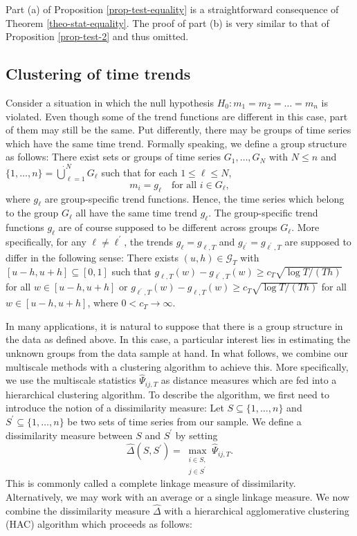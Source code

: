 Part (a) of Proposition \ref{prop-test-equality} is a straightforward consequence of Theorem \ref{theo-stat-equality}. The proof of part (b) is very similar to that of Proposition \ref{prop-test-2} and thus omitted. 


\subsection{Clustering of time trends}\label{subsec-test-equality-clustering}


Consider a situation in which the null hypothesis $H_0: m_1 = m_2 = \ldots = m_n$ is violated. Even though some of the trend functions are different in this case, part of them may still be the same. Put differently, there may be groups of time series which have the same time trend. Formally speaking, we define a group structure as follows: There exist sets or groups of time series $G_1,\ldots,G_N$ with $N \le n$ and $\{1,\ldots,n\} = \mathbin{\dot{\bigcup}}_{\ell=1}^{N} G_\ell$ such that for each $1 \le \ell \le N$,
\[ m_i = g_\ell \quad \text{for all } i \in G_\ell, \]
where $g_\ell$ are group-specific trend functions. Hence, the time series which belong to the group $G_\ell$ all have the same time trend $g_\ell$. The group-specific trend functions $g_\ell$ are of course supposed to be different across groups $G_\ell$. More specifically, for any $\ell \ne \ell^\prime$, the trends $g_\ell = g_{\ell,T}$ and $g_{\ell^\prime} = g_{\ell^\prime,T}$ are supposed to differ in the following sense: There exists $(u,h) \in \mathcal{G}_T$ with $[u-h,u+h] \subseteq [0,1]$ such that $g_{\ell,T}(w) - g_{\ell^\prime,T}(w) \ge c_T \sqrt{\log T/(Th)}$ for all $w \in [u-h,u+h]$ or $g_{\ell^\prime,T}(w) - g_{\ell,T}(w) \ge c_T \sqrt{\log T/(Th)}$ for all $w \in [u-h,u+h]$, where $0 < c_T \rightarrow \infty$.


In many applications, it is natural to suppose that there is a group structure in the data as defined above. In this case, a particular interest lies in estimating the unknown groups from the data sample at hand. In what follows, we combine our multiscale methods with a clustering algorithm to achieve this. More specifically, we use the multiscale statistics $\widehat{\Psi}_{ij,T}$ as distance measures which are fed into a hierarchical clustering algorithm. To describe the algorithm, we first need to introduce the notion of a dissimilarity measure: Let $S \subseteq \{1,\ldots,n\}$ and $S^\prime \subseteq \{1,\ldots,n\}$ be two sets of time series from our sample. We define a dissimilarity measure between $S$ and $S^\prime$ by setting 
\begin{equation}\label{dissimilarity}
\widehat{\Delta}(S,S^\prime) = \max_{\substack{i \in S, \\ j \in S^\prime}} \widehat{\Psi}_{ij,T}. 
\end{equation}
This is commonly called a complete linkage measure of dissimilarity. Alternatively, we may work with an average or a single linkage measure. We now combine the dissimilarity measure $\widehat{\Delta}$ with a hierarchical agglomerative clustering (HAC) algorithm which proceeds as follows: 
\vspace{10pt}

